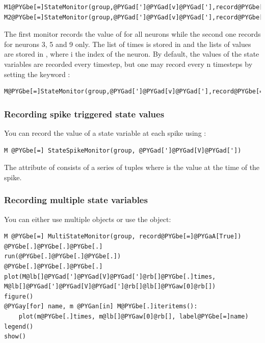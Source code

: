 \documentclass[letterpaper,10pt,english]{manual}
\begin{document}
\begin{Verbatim}[commandchars=@\[\]]
M1@PYGbe[=]StateMonitor(group,@PYGad[']@PYGad[v]@PYGad['],record@PYGbe[=]@PYGaA[True])
M2@PYGbe[=]StateMonitor(group,@PYGad[']@PYGad[v]@PYGad['],record@PYGbe[=]@lb[]@PYGaw[3],@PYGaw[5],@PYGaw[9]@rb[])
\end{Verbatim}

The first monitor records the value of  for all neurons while the second one records  for
neurons 3, 5 and 9 only. The list of times is stored in  and the lists of values are stored in
, where i the index of the neuron.
By default, the values of the state variables are recorded every timestep, but one may record every n timesteps
by setting the keyword :

\begin{Verbatim}[commandchars=@\[\]]
M@PYGbe[=]StateMonitor(group,@PYGad[']@PYGad[v]@PYGad['],record@PYGbe[=]@PYGaA[True],timestep@PYGbe[=]n)
\end{Verbatim}


\subsubsection{Recording spike triggered state values}

You can record the value of a state variable at each spike using \hyperlink{brian.StateSpikeMonitor}{}:

\begin{Verbatim}[commandchars=@\[\]]
M @PYGbe[=] StateSpikeMonitor(group, @PYGad[']@PYGad[V]@PYGad['])
\end{Verbatim}

The  attribute of  consists of a series of tuples  where  is the
value at the time of the spike.


\subsubsection{Recording multiple state variables}

You can either use multiple \hyperlink{brian.StateMonitor}{} objects or use the \hyperlink{brian.MultiStateMonitor}{}
object:

\begin{Verbatim}[commandchars=@\[\]]
M @PYGbe[=] MultiStateMonitor(group, record@PYGbe[=]@PYGaA[True])
@PYGbe[.]@PYGbe[.]@PYGbe[.]
run(@PYGbe[.]@PYGbe[.]@PYGbe[.])
@PYGbe[.]@PYGbe[.]@PYGbe[.]
plot(M@lb[]@PYGad[']@PYGad[V]@PYGad[']@rb[]@PYGbe[.]times, M@lb[]@PYGad[']@PYGad[V]@PYGad[']@rb[]@lb[]@PYGaw[0]@rb[])
figure()
@PYGay[for] name, m @PYGan[in] M@PYGbe[.]iteritems():
    plot(m@PYGbe[.]times, m@lb[]@PYGaw[0]@rb[], label@PYGbe[=]name)
legend()
show()
\end{Verbatim}
\end{document}
